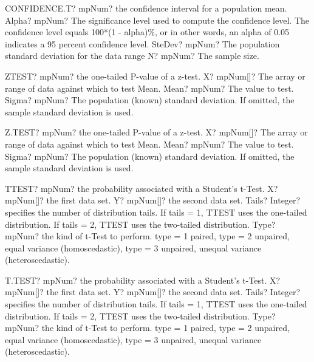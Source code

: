 \documentclass[12pt,a4paper,openany]{book}
\begin{document}
\begin{mpFunctionsExtract}
\mpWorksheetFunctionThreeNotImplemented
{CONFIDENCE.T? mpNum? the confidence interval for a population mean.}
{Alpha? mpNum? The significance level used to compute the confidence level. The confidence level equals 100*(1 - alpha)\%, or in other words, an alpha of 0.05 indicates a 95 percent confidence level.
}
{SteDev? mpNum? The population standard deviation for the data range}
{N? mpNum? The sample size.}
\end{mpFunctionsExtract}

\begin{mpFunctionsExtract}
\mpWorksheetFunctionThreeNotImplemented
{ZTEST? mpNum? the one-tailed P-value of a z-test.}
{X? mpNum[]? The array or range of data against which to test Mean.}
{Mean? mpNum? The value to test.}
{Sigma? mpNum? The population (known) standard deviation. If omitted, the sample standard deviation is used.}
\end{mpFunctionsExtract}

\begin{mpFunctionsExtract}
\mpWorksheetFunctionThreeNotImplemented
{Z.TEST? mpNum? the one-tailed P-value of a z-test.}
{X? mpNum[]? The array or range of data against which to test Mean.}
{Mean? mpNum? The value to test.}
{Sigma? mpNum? The population (known) standard deviation. If omitted, the sample standard deviation is used.}
\end{mpFunctionsExtract}

\begin{mpFunctionsExtract}
\mpWorksheetFunctionFourNotImplemented
{TTEST? mpNum? the probability associated with a Student's t-Test.}
{X? mpNum[]? the first data set.}
{Y? mpNum[]? the second data set.}
{Tails? Integer?  specifies the number of distribution tails. If tails = 1, TTEST uses the one-tailed distribution. If tails = 2, TTEST uses the two-tailed distribution.}
{Type? mpNum? the kind of t-Test to perform. type = 1 paired, type = 2 unpaired, equal variance (homoscedastic), type = 3 unpaired, unequal variance (heteroscedastic).}
\end{mpFunctionsExtract}

\begin{mpFunctionsExtract}
\mpWorksheetFunctionFourNotImplemented
{T.TEST? mpNum? the probability associated with a Student's t-Test.}
{X? mpNum[]? the first data set.}
{Y? mpNum[]? the second data set.}
{Tails? Integer?  specifies the number of distribution tails. If tails = 1, TTEST uses the one-tailed distribution. If tails = 2, TTEST uses the two-tailed distribution.}
{Type? mpNum? the kind of t-Test to perform. type = 1 paired, type = 2 unpaired, equal variance (homoscedastic), type = 3 unpaired, unequal variance (heteroscedastic).}
\end{mpFunctionsExtract}
\end{document}
